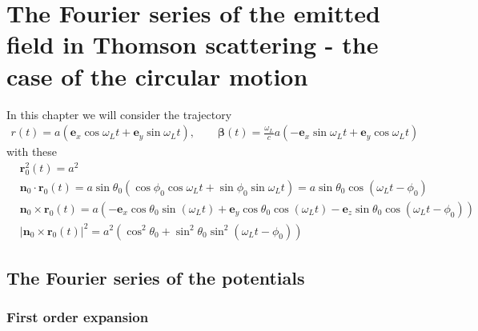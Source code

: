 \chapter{The Fourier series of the emitted field in Thomson scattering - the case of the circular motion}


In this chapter we will consider the trajectory
\begin{align}
    r(t)=a\left({\bm e}_x\cos\omega_L t+{\bm e}_y\sin\omega_L t\right), \qquad {\boldsymbol{\beta}}(t)=\frac{\omega_L}ca\left(-{\bm e}_x\sin\omega_Lt+{\bm e}_y\cos\omega_Lt\right)
\end{align}
with these
\begin{align}
     & {\bm r}^2_0(t)=a^2                                                                                                                                       \\
     & {\bm n}_0\cdot{\bm r}_0(t)=a\sin\theta_0(\cos\phi_0\cos\omega_Lt+\sin\phi_0\sin\omega_Lt)=a\sin\theta_0\cos(\omega_Lt-\phi_0)                            \\
     & {\bm n}_0\times{\bm r}_0(t)=a(-{\bm e}_x\cos\theta_0\sin(\omega_L t)+{\bm e}_y \cos\theta_0\cos(\omega_L t)-{\bm e}_z\sin\theta_0\cos(\omega_Lt-\phi_0)) \\
     & |{\bm n}_0\times{\bm r}_0(t)|^2=a^2\left(\cos^2\theta_0+\sin^2\theta_0\sin^2(\omega_Lt -\phi_0)\right)
\end{align}
\section{The Fourier series of the potentials}



\subsection{First order expansion}

